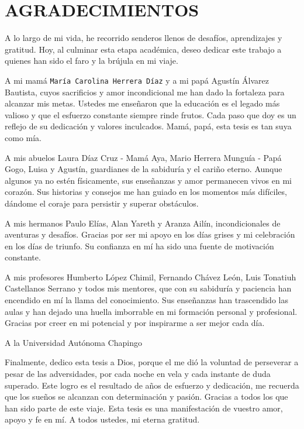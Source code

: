 

\chapter*{AGRADECIMIENTOS}
A lo largo de mi vida, he recorrido senderos llenos de desafíos, aprendizajes y gratitud. Hoy, al culminar esta etapa académica, deseo dedicar este trabajo a quienes han sido el faro y la brújula en mi viaje.

A mi mamá \texttt{María Carolina Herrera Díaz} y a mi papá Agustín Álvarez Bautista, cuyos sacrificios y amor incondicional me han dado la fortaleza para alcanzar mis metas. Ustedes me enseñaron que la educación es el legado más valioso y que el esfuerzo constante siempre rinde frutos. Cada paso que doy es un reflejo de su dedicación y valores inculcados. Mamá, papá, esta tesis es tan suya como mía.

A mis abuelos Laura Díaz Cruz - Mamá Aya, Mario Herrera Munguía - Papá Gogo, Luisa y Agustín, guardianes de la sabiduría y el cariño eterno. Aunque algunos ya no estén físicamente, sus enseñanzas y amor permanecen vivos en mi corazón. Sus historias y consejos me han guiado en los momentos más difíciles, dándome el coraje para persistir y superar obstáculos.

A mis hermanos Paulo Elías, Alan Yareth y Aranza Ailín, incondicionales de aventuras y desafíos. Gracias por ser mi apoyo en los días grises y mi celebración en los días de triunfo. Su confianza en mí ha sido una fuente de motivación constante.

A mis profesores Humberto López Chimil, Fernando Chávez León, Luis Tonatiuh Castellanos Serrano y todos mis mentores, que con su sabiduría y paciencia han encendido en mí la llama del conocimiento. Sus enseñanzas han trascendido las aulas y han dejado una huella imborrable en mi formación personal y profesional. Gracias por creer en mi potencial y por inspirarme a ser mejor cada día.

A la Universidad Autónoma Chapingo

Finalmente, dedico esta tesis a Dios, porque el me dió la voluntad de perseverar a pesar de las adversidades, por cada noche en vela y cada instante de duda superado. Este logro es el resultado de años de esfuerzo y dedicación, me recuerda que los sueños se alcanzan con determinación y pasión. Gracias a todos los que han sido parte de este viaje. Esta tesis es una manifestación de vuestro amor, apoyo y fe en mí. A todos ustedes, mi eterna gratitud.

\renewcommand{\contentsname}{CONTENIDO}
\tableofcontents

\renewcommand{\listtablename}{LISTA DE CUADROS}
\listoftables

\renewcommand{\listfigurename}{LISTA DE FIGURAS}
\listoffigures

\renewcommand{\abstractname}{RESUMEN}
